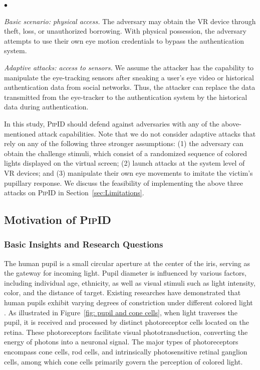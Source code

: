 \documentclass[sigconf]{acmart}
\newcommand{\sysname}{\textsc{PipID}\xspace}
\newenvironment{packeditemize}{
\begin{list}{$\bullet$}{
\setlength{\labelwidth}{8pt}
\setlength{\itemsep}{2pt}
\setlength{\leftmargin}{\labelwidth}
\addtolength{\leftmargin}{\labelsep}
\setlength{\parindent}{0pt}
\setlength{\listparindent}{\parindent}
\setlength{\parsep}{0pt}
\setlength{\topsep}{3pt}}}{\end{list}}
\begin{document}
\begin{packeditemize}
    \item \textit{Basic scenario: physical access.} The adversary may obtain the VR device through theft, loss, or unauthorized borrowing. With physical possession, the adversary attempts to use their own eye motion credentials to bypass the authentication system.
    \item \textit{Adaptive attacks: access to sensors.} We assume the attacker has the capability to manipulate the eye-tracking sensors after sneaking a user's eye video or historical authentication data from social networks. Thus, the attacker can replace the data transmitted from the eye-tracker to the authentication system by the historical data during authentication.
\end{packeditemize}

In this study, \sysname should defend against adversaries with any of the above-mentioned attack capabilities. Note that we do not consider adaptive attacks that rely on any of the following three stronger assumptions: (1) the adversary can obtain the challenge stimuli, which consist of a randomized sequence of colored lights displayed on the virtual screen; (2) launch attacks at the system level of VR devices; and (3) manipulate their own eye movements to imitate the victim's pupillary response. We discuss the feasibility of implementing the above three attacks on \sysname in Section~\ref{sec:Limitations}.


\subsection{Motivation of \sysname}

\subsubsection{Basic Insights and Research Questions}
The human pupil is a small circular aperture at the center of the iris, serving as the gateway for incoming light. Pupil diameter is influenced by various factors, including individual age, ethnicity, as well as visual stimuli such as light intensity, color, and the distance of target. Existing researches have demonstrated that human pupils exhibit varying degrees of constriction under different colored light \cite{do2010intrinsically,herbst2011test,Kardon2009,YOUNG2008862,ishikawa2012effects, Bonmati_fneur201801019, lobato2014pupillary}. As illustrated in Figure~\ref{fig: pupil and cone cells}, when light traverses the pupil, it is received and processed by distinct photoreceptor cells located on the retina. These photoreceptors facilitate visual phototransduction, converting the energy of photons into a neuronal signal. The major types of photoreceptors encompass cone cells, rod cells, and intrinsically photosensitive retinal ganglion cells, among which cone cells primarily govern the perception of colored light.
\end{document}
